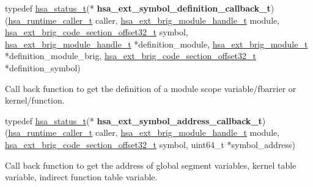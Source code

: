 \documentclass[final]{book}
\begin{document}
\noindent\begin{tcolorbox}[nobeforeafter,arc=0mm,colframe=white,colback=lightgray,left=0mm]
typedef \hyperlink{group__status_1gad755322e7ff95456520e8abdbe90d225}{hsa_status_t}(*  \hypertarget{group__FinalizerCoreApi_1ga961d2842da110520beda334eedcb2e31}{\textbf{hsa_ext_symbol_definition_callback_t}})(\hyperlink{group__RuntimeCommon_1ga7d9b1191602415f5dd3893985cc93826}{hsa_runtime_caller_t} caller, \hyperlink{group__FinalizerCoreApi_1ga0216996f5341a8591ecf9e0f6fd1b7e5}{\hyperlink{group__FinalizerCoreApi_1ga0216996f5341a8591ecf9e0f6fd1b7e5}{hsa_ext_brig_module_handle_t}} module, \hyperlink{group__FinalizerCoreApi_1ga494b8ac14a8c10af95b83b51a8a4ad7f}{\hyperlink{group__FinalizerCoreApi_1ga494b8ac14a8c10af95b83b51a8a4ad7f}{hsa_ext_brig_code_section_offset32_t}} symbol, \hyperlink{group__FinalizerCoreApi_1ga0216996f5341a8591ecf9e0f6fd1b7e5}{\hyperlink{group__FinalizerCoreApi_1ga0216996f5341a8591ecf9e0f6fd1b7e5}{hsa_ext_brig_module_handle_t}} *definition_module, \hyperlink{group__FinalizerCoreApi_1ga104477d24306200a2847b44c325e312a}{hsa_ext_brig_module_t} *definition_module_brig, \hyperlink{group__FinalizerCoreApi_1ga494b8ac14a8c10af95b83b51a8a4ad7f}{\hyperlink{group__FinalizerCoreApi_1ga494b8ac14a8c10af95b83b51a8a4ad7f}{hsa_ext_brig_code_section_offset32_t}} *definition_symbol)
\end{tcolorbox}
Call back function to get the definition of a module scope variable/fbarrier or kernel/function.
\\

\noindent\begin{tcolorbox}[nobeforeafter,arc=0mm,colframe=white,colback=lightgray,left=0mm]
typedef \hyperlink{group__status_1gad755322e7ff95456520e8abdbe90d225}{hsa_status_t}(*  \hypertarget{group__FinalizerCoreApi_1gaa0ae3a2a5a88c4b4799d4838da6c571e}{\textbf{hsa_ext_symbol_address_callback_t}})(\hyperlink{group__RuntimeCommon_1ga7d9b1191602415f5dd3893985cc93826}{hsa_runtime_caller_t} caller, \hyperlink{group__FinalizerCoreApi_1ga0216996f5341a8591ecf9e0f6fd1b7e5}{hsa_ext_brig_module_handle_t} module, \hyperlink{group__FinalizerCoreApi_1ga494b8ac14a8c10af95b83b51a8a4ad7f}{hsa_ext_brig_code_section_offset32_t} symbol, uint64_t *symbol_address)
\end{tcolorbox}
Call back function to get the address of global segment variables, kernel table variable, indirect function table variable.
\\
\end{document}
